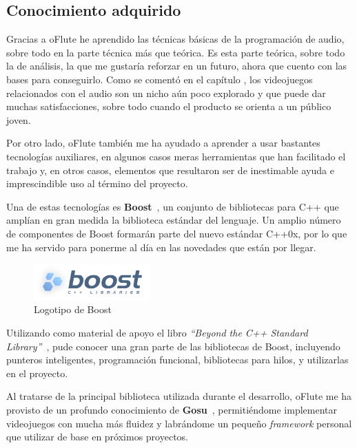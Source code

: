 \subsection{Conocimiento adquirido}

Gracias a oFlute he aprendido las técnicas básicas de la programación de audio,
sobre todo en la parte técnica más que teórica. Es esta parte teórica, sobre
todo la de análisis, la que me gustaría reforzar en un futuro, ahora que cuento
con las bases para conseguirlo. Como se comentó en el capítulo
\textit{}, los videojuegos relacionados con el audio
son un nicho aún poco explorado y que puede dar muchas satisfacciones, sobre
todo cuando el producto se orienta a un público joven.

Por otro lado, oFlute también me ha ayudado a aprender a usar bastantes
tecnologías auxiliares, en algunos casos meras herramientas que han facilitado
el trabajo y, en otros casos, elementos que resultaron ser de inestimable ayuda
e imprescindible uso al término del proyecto.

Una de estas tecnologías es \textbf{Boost}~\cite{boost}, un conjunto de
bibliotecas para C++ que amplían en gran medida la biblioteca estándar del
lenguaje. Un amplio número de componentes de Boost formarán parte del nuevo
estándar C++0x, por lo que me ha servido para ponerme al día en las
novedades que están por llegar.

\begin{figure}[htp!]
  \centering
  \includegraphics[width=0.4\textwidth]{8_conclusiones/imagen_logoboost}
  \caption{Logotipo de Boost}
\end{figure}

Utilizando como material de apoyo el libro \textit{``Beyond the C++ Standard
  Library''}~\cite{libroboost}, pude conocer una gran parte de las bibliotecas
de Boost, incluyendo punteros inteligentes, programación funcional, bibliotecas
para hilos, y utilizarlas en el proyecto.

Al tratarse de la principal biblioteca utilizada durante el desarrollo, oFlute
me ha provisto de un profundo conocimiento de \textbf{Gosu}~\cite{gosu},
permitiéndome implementar videojuegos con mucha más fluidez y labrándome un
pequeño \textit{framework} personal que utilizar de base en próximos
proyectos. 

